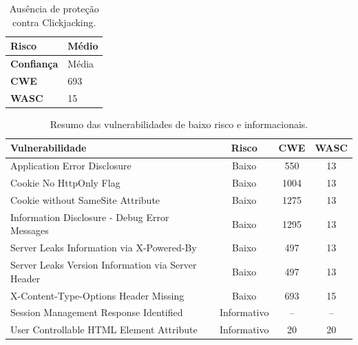\begin{table}[H]
\centering
\begin{tabular}{|l|p{9cm}|}
\hline
\textbf{Risco} & Médio \\ \hline
\textbf{Confiança} & Média \\ \hline
\textbf{CWE} & 693 \\ \hline
\textbf{WASC} & 15 \\ \hline
\end{tabular}
\caption{Ausência de proteção contra Clickjacking.}
\label{tab:clickjacking}
\end{table}

\begin{table}[H]
\centering
\small
\begin{tabular}{|p{5cm}|c|c|c|}
\hline
\textbf{Vulnerabilidade} & \textbf{Risco} & \textbf{CWE} & \textbf{WASC} \\ \hline
Application Error Disclosure & Baixo & 550 & 13 \\ \hline
Cookie No HttpOnly Flag & Baixo & 1004 & 13 \\ \hline
Cookie without SameSite Attribute & Baixo & 1275 & 13 \\ \hline
Information Disclosure - Debug Error Messages & Baixo & 1295 & 13 \\ \hline
Server Leaks Information via X-Powered-By & Baixo & 497 & 13 \\ \hline
Server Leaks Version Information via Server Header & Baixo & 497 & 13 \\ \hline
X-Content-Type-Options Header Missing & Baixo & 693 & 15 \\ \hline
Session Management Response Identified & Informativo & -- & -- \\ \hline
User Controllable HTML Element Attribute & Informativo & 20 & 20 \\ \hline
\end{tabular}
\caption{Resumo das vulnerabilidades de baixo risco e informacionais.}
\label{tab:lowrisk}
\end{table}
